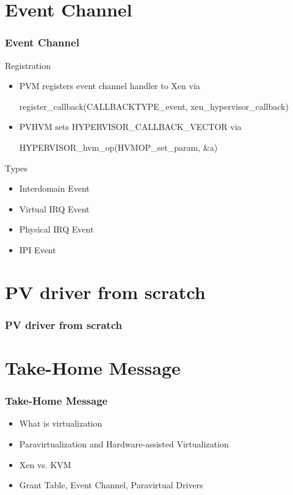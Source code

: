 \documentclass[aspectratio=169]{beamer}
\begin{document}
\section{Event Channel}
\begin{frame}
\frametitle{Event Channel}
\begin{block}{Registration}
\begin{itemize}
\item PVM registers event channel handler to Xen via 

register\_callback(CALLBACKTYPE\_event, xen\_hypervisor\_callback)

\item PVHVM sets HYPERVISOR\_CALLBACK\_VECTOR via

HYPERVISOR\_hvm\_op(HVMOP\_set\_param, \&a)
\end{itemize}
\end{block}
\begin{block}{Types}
\begin{itemize}
\item Interdomain Event
\item Virtual IRQ Event
\item Physical IRQ Event
\item IPI Event
\end{itemize}
\end{block}
\end{frame}


\section{PV driver from scratch}
\begin{frame}
\frametitle{PV driver from scratch}
\end{frame}


\section{Take-Home Message}
\begin{frame}
\frametitle{Take-Home Message}
\begin{itemize}
\item What is virtualization
\item Paravirtualization and Hardware-assisted Virtualization
\item Xen vs. KVM
\item Grant Table, Event Channel, Paravirtual Drivers
\end{itemize}
\end{frame}


\end{document}
